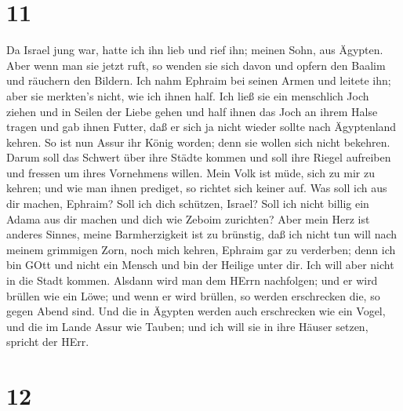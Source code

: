 \hypertarget{section-10}{%
\section{11}\label{section-10}}

 Da Israel jung war, hatte ich ihn lieb und rief ihn; meinen
Sohn, aus Ägypten.  Aber wenn man sie jetzt ruft, so wenden
sie sich davon und opfern den Baalim und räuchern den Bildern.
 Ich nahm Ephraim bei seinen Armen und leitete ihn; aber sie
merkten's nicht, wie ich ihnen half.  Ich ließ sie ein
menschlich Joch ziehen und in Seilen der Liebe gehen und half ihnen das
Joch an ihrem Halse tragen und gab ihnen Futter,  daß er
sich ja nicht wieder sollte nach Ägyptenland kehren. So ist nun Assur
ihr König worden; denn sie wollen sich nicht bekehren. 
Darum soll das Schwert über ihre Städte kommen und soll ihre Riegel
aufreiben und fressen um ihres Vornehmens willen.  Mein Volk
ist müde, sich zu mir zu kehren; und wie man ihnen prediget, so richtet
sich keiner auf.  Was soll ich aus dir machen, Ephraim? Soll
ich dich schützen, Israel? Soll ich nicht billig ein Adama aus dir
machen und dich wie Zeboim zurichten? Aber mein Herz ist anderes Sinnes,
meine Barmherzigkeit ist zu brünstig,  daß ich nicht tun
will nach meinem grimmigen Zorn, noch mich kehren, Ephraim gar zu
verderben; denn ich bin GOtt und nicht ein Mensch und bin der Heilige
unter dir. Ich will aber nicht in die Stadt kommen. 
Alsdann wird man dem HErrn nachfolgen; und er wird brüllen wie ein Löwe;
und wenn er wird brüllen, so werden erschrecken die, so gegen Abend
sind.  Und die in Ägypten werden auch erschrecken wie ein
Vogel, und die im Lande Assur wie Tauben; und ich will sie in ihre
Häuser setzen, spricht der HErr.

\hypertarget{section-11}{%
\section{12}\label{section-11}}

